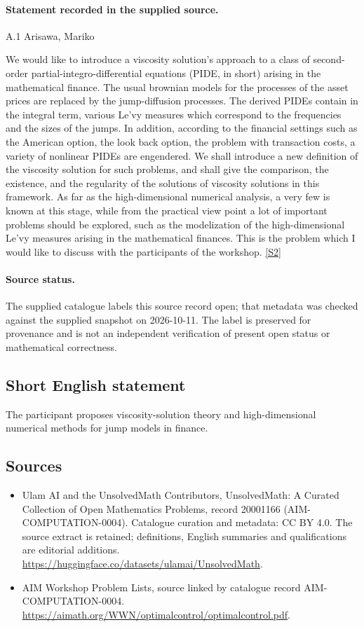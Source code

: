 \documentclass[11pt]{article}
\begin{document}
\paragraph{Statement recorded in the supplied source.}
A.1 Arisawa, Mariko

We would like to introduce a viscosity solution's approach to a class of second-order partial-integro-differential equations (PIDE, in short) arising in the mathematical finance. The usual brownian models for the processes of the asset prices are replaced by the jump-diffusion processes. The derived PIDEs contain in the integral term, various Le'vy measures which correspond to the frequencies and the sizes of the jumps. In addition, according to the financial settings such as the American option, the look back option, the problem with transaction costs, a variety of nonlinear PIDEs are engendered. We shall introduce a new definition of the viscosity solution for such problems, and shall give the comparison, the existence, and the regularity of the solutions of viscosity solutions in this framework. As far as the high-dimensional numerical analysis, a very few is known at this stage, while from the practical view point a lot of important problems should be explored, such as the modelization of the high-dimensional Le'vy measures arising in the mathematical finances. This is the problem which I would like to discuss with the participants of the workshop. \href{https://aimath.org/WWN/optimalcontrol/optimalcontrol.pdf}{[S2]}
\paragraph{Source status.}
The supplied catalogue labels this source record open; that metadata was checked against the supplied snapshot on 2026-10-11. The label is preserved for provenance and is not an independent verification of present open status or mathematical correctness.
\subsection{Short English statement}
The participant proposes viscosity-solution theory and high-dimensional numerical methods for jump models in finance.
\subsection{Sources}
\begin{itemize}
\item[S1] Ulam AI and the UnsolvedMath Contributors, UnsolvedMath: A Curated Collection of Open Mathematics Problems, record 20001166 (AIM-COMPUTATION-0004). Catalogue curation and metadata: CC BY 4.0. The source extract is retained; definitions, English summaries and qualifications are editorial additions.
\url{https://huggingface.co/datasets/ulamai/UnsolvedMath}.
\item[S2] AIM Workshop Problem Lists, source linked by catalogue record AIM-COMPUTATION-0004.
\url{https://aimath.org/WWN/optimalcontrol/optimalcontrol.pdf}.
\end{itemize}
\end{document}
